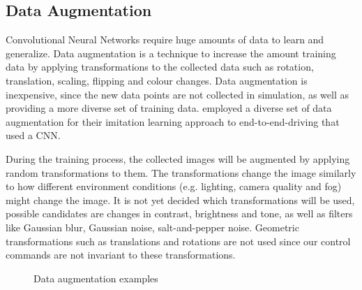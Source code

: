 

\subsection*{Data Augmentation}

Convolutional Neural Networks require huge amounts of data to learn and generalize. Data augmentation is a technique to increase the amount training data by applying transformations to the collected data such as rotation, translation, scaling, flipping and colour changes. Data augmentation is inexpensive, since the new data points are not collected in simulation, as well as providing a more diverse set of training data. \autocite{conditional_imitation_learning_for_driving} employed a diverse set of data augmentation for their imitation learning approach to end-to-end-driving that used a CNN.

During the training process, the collected images will be augmented by applying random transformations to them. The transformations change the image similarly to how different environment conditions (e.g. lighting, camera quality and fog) might change the image. It is not yet decided which transformations will be used, possible candidates are changes in contrast, brightness and tone, as well as filters like Gaussian blur, Gaussian noise, salt-and-pepper noise.
Geometric transformations such as translations and rotations are not used since our control commands are not invariant to these transformations.

\begin{figure}
     \centering
     \caption{Data augmentation examples}
     \label{fig:data_augmentation}
\end{figure}




